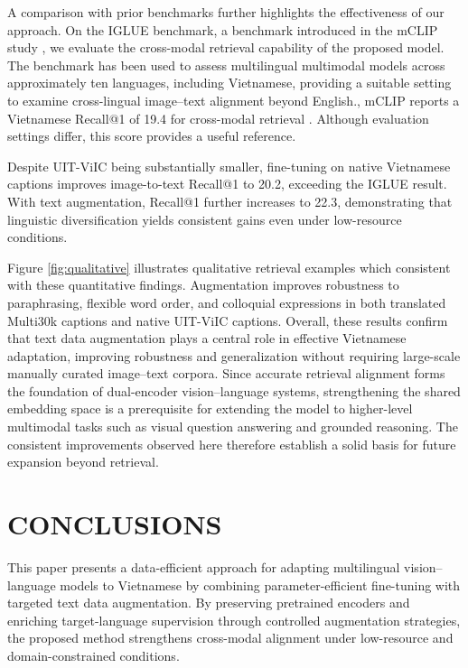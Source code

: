 A comparison with prior benchmarks further highlights the effectiveness of our approach.
On the IGLUE benchmark, a benchmark introduced in the mCLIP study \cite{chen-etal-2023-mclip}, we evaluate the cross-modal retrieval capability of the proposed model. The benchmark has been used to assess multilingual multimodal models across approximately ten languages, including Vietnamese, providing a suitable setting to examine cross-lingual image–text alignment beyond English., mCLIP reports a Vietnamese Recall@1 of 19.4 for cross-modal retrieval \cite{radford2021learningtransferablevisualmodels}. Although evaluation settings differ, this score provides a useful reference.

Despite UIT-ViIC being substantially smaller, fine-tuning on native Vietnamese captions improves image-to-text Recall@1 to 20.2, exceeding the IGLUE result.
With text augmentation, Recall@1 further increases to 22.3, demonstrating that linguistic diversification yields consistent gains even under low-resource conditions.



Figure \ref{fig:qualitative} illustrates qualitative retrieval examples which consistent with these quantitative findings. Augmentation improves robustness to paraphrasing, flexible word order, and colloquial expressions in both translated Multi30k captions and native UIT-ViIC captions. Overall, these results confirm that text data augmentation plays a central role in effective Vietnamese adaptation, improving robustness and generalization without requiring large-scale manually curated image--text corpora. Since accurate retrieval alignment forms the foundation of dual-encoder vision--language systems, strengthening the shared embedding space is a prerequisite for extending the model to higher-level multimodal tasks such as visual question answering and grounded reasoning. The consistent improvements observed here therefore establish a solid basis for future expansion beyond retrieval.


\section{CONCLUSIONS}
\label{sec:conclusion}

This paper presents a data-efficient approach for adapting multilingual vision--language models to Vietnamese by combining parameter-efficient fine-tuning with targeted text data augmentation. By preserving pretrained encoders and enriching target-language supervision through controlled augmentation strategies, the proposed method strengthens cross-modal alignment under low-resource and domain-constrained conditions.

